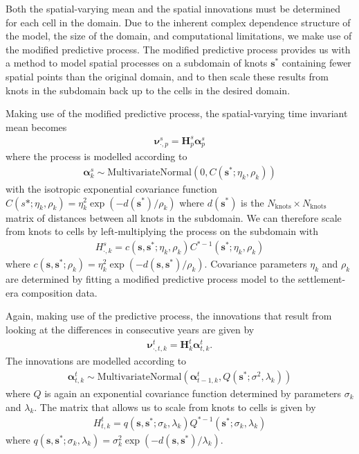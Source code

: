 \documentclass[12pt]{article}
\begin{document}
Both the spatial-varying mean and the spatial innovations must be determined for each cell in the domain. Due to the inherent complex dependence structure of the model, the size of the domain, and computational limitations, we make use of the modified predictive process. The modified predictive process provides us with a method to model spatial processes on a subdomain of knots $\bm{s^*}$ containing fewer spatial points than the original domain, and to then scale these results from knots in the subdomain back up to the cells in the desired domain. 

Making use of the modified predictive process, the spatial-varying time invariant mean becomes
\begin{align*}
\bm{\nu}_{\cdot, p}^s = \bm{H}_p^s \bm{\alpha}_{p}^s
\end{align*}
where the process is modelled according to
\begin{align*}
\bm{\alpha}^s_{k} \sim \text{MultivariateNormal}(0, C(\bm{s^{*}}; \eta_k, \rho_k)) 
\end{align*}
with the isotropic exponential covariance function $C(s*; \eta_k, \rho_k) = \eta_k^2 \exp(-d(\bm{s^*})/\rho_k )$ where $d(\bm{s^*})$ is the $N_{\text{knots}} \times N_{\text{knots}}$ matrix of distances between all knots in the subdomain. We can therefore scale from knots to cells by left-multiplying the process on the subdomain with
\begin{align*}
H^s_{\cdot,k} = c(\bm{s}, \bm{s^*}; \eta_k, \rho_k) C^{*-1}(\bm{s^*}; \eta_k, \rho_k)
\end{align*}
where $c(\bm{s}, \bm{s^*}; \rho_k) = \eta_k^2 \exp( -d(\bm{s}, \bm{s^*}) / \rho_k)$. Covariance parameters $\eta_k$ and $\rho_k$ are determined by fitting a modified predictive process model to the settlement-era composition data.

Again, making use of the predictive process, the innovations that result from looking at the differences
in consecutive years are given by
\begin{align*}
\bm{\nu}_{\cdot, t, k}^t = \bm{H}_k^t \bm{\alpha}_{t,k}^t.
\end{align*}
The innovations are modelled according to
\begin{align*}
\bm{\alpha}^t_{t,k} \sim \text{MultivariateNormal}(\bm{\alpha}^t_{t-1,k}, Q(\bm{s^*}; \sigma^2, \lambda_k))
\end{align*}
where $Q$ is again an exponential covariance function determined by
parameters $\sigma_k$ and $\lambda_k$. The matrix that allows us to
scale from knots to cells is given by
\begin{align*}
H^t_{t,k} =  q(\bm{s}, \bm{s^*}; \sigma_k, \lambda_k) Q^{*-1}(\bm{s^*}; \sigma_k, \lambda_k)
\end{align*}
where $q(\bm{s}, \bm{s^*}; \sigma_k, \lambda_k) = \sigma_k^2 \exp( -d(\bm{s},\bm{s^*}) / \lambda_k)$.
\end{document}
